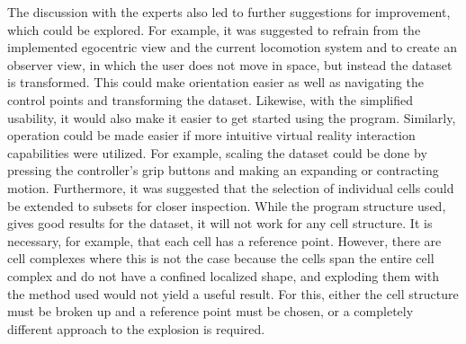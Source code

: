 The discussion with the experts also led to further suggestions for improvement, which could be explored. For example, it was suggested to refrain from the implemented egocentric view and the current locomotion system and to create an observer view, in which the user does not move in space, but instead the dataset is transformed. This could make orientation easier as well as navigating the control points and transforming the dataset. Likewise, with the simplified usability, it would also make it easier to get started using the program. Similarly, operation could be made easier if more intuitive virtual reality interaction capabilities were utilized. For example, scaling the dataset could be done by pressing the controller's grip buttons and making an expanding or contracting motion. Furthermore, it was suggested that the selection of individual cells could be extended to subsets for closer inspection. While the program structure used, gives good results for the dataset, it will not work for any cell structure. It is necessary, for example, that each cell has a reference point. However, there are cell complexes where this is not the case because the cells span the entire cell complex and do not have a confined localized shape, and exploding them with the method used would not yield a useful result. For this, either the cell structure must be broken up and a reference point must be chosen, or a completely different approach to the explosion is required.

